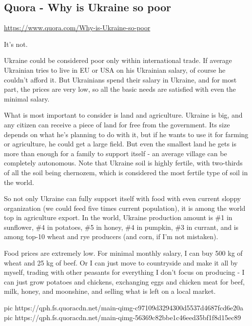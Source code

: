  
 

\subsection{Quora - Why is Ukraine so poor}

\url{https://www.quora.com/Why-is-Ukraine-so-poor}

It’s not.

Ukraine could be considered poor only within international trade. If average
Ukrainian tries to live in EU or USA on his Ukrainian salary, of course he
couldn’t afford it. But Ukrainians spend their salary in Ukraine, and for most
part, the prices are very low, so all the basic needs are satisfied with even
the minimal salary.

What is most important to consider is land and agriculture. Ukraine is big, and
any citizen can receive a piece of land for free from the government. Its size
depends on what he’s planning to do with it, but if he wants to use it for
farming or agriculture, he could get a large field. But even the smallest land
he gets is more than enough for a family to support itself - an average village
can be completely autonomous. Note that Ukraine soil is highly fertile, with
two-thirds of all the soil being chernozem, which is considered the most
fertile type of soil in the world.

So not only Ukraine can fully support itself with food with even current sloppy
organization (we could feed five times current population), it is among the
world top in agriculture export. In the world, Ukraine production amount is \#1
in sunflower, \#4 in potatoes, \#5 in honey, \#4 in pumpkin, \#3 in currant,
and is among top-10 wheat and rye producers (and corn, if I’m not mistaken).

Food prices are extremely low. For minimal monthly salary, I can buy 500 kg of
wheat and 25 kg of beef. Or I can just move to countryside and make it all by
myself, trading with other peasants for everything I don’t focus on producing -
I can just grow potatoes and chickens, exchanging eggs and chicken meat for
beef, milk, honey, and moonshine, and selling what is left on a local market.

\ifcmt
	pic https://qph.fs.quoracdn.net/main-qimg-c97109d3294300d5537d4687fcd6e20a
	pic https://qph.fs.quoracdn.net/main-qimg-56369c82bbe1c46eed35bf1f8d15ec89
\fi

